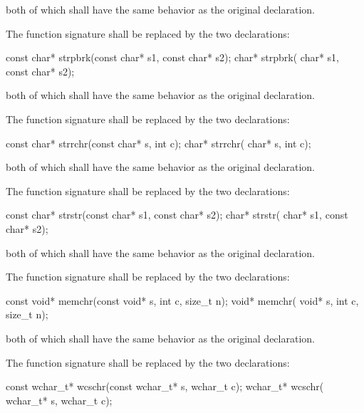 both of which shall have the same behavior as the original declaration.

\pnum
{}%
The function signature
shall be replaced by the two declarations:

\begin{codeblock}
const char* strpbrk(const char* s1, const char* s2);
      char* strpbrk(      char* s1, const char* s2);
\end{codeblock}

both of which shall have the same behavior as the original declaration.

\pnum
{}%
The function signature
shall be replaced by the two declarations:

\begin{codeblock}
const char* strrchr(const char* s, int c);
      char* strrchr(      char* s, int c);
\end{codeblock}

both of which shall have the same behavior as the original declaration.

\pnum
{}%
The function signature
shall be replaced by the two declarations:

\begin{codeblock}
const char* strstr(const char* s1, const char* s2);
      char* strstr(      char* s1, const char* s2);
\end{codeblock}

both of which shall have the same behavior as the original declaration.

\pnum
{}%
The function signature
shall be replaced by the two declarations:

\begin{codeblock}
const void* memchr(const void* s, int c, size_t n);
      void* memchr(      void* s, int c, size_t n);
\end{codeblock}

both of which shall have the same behavior as the original declaration.

\pnum
{}%
The function signature
shall be replaced by the two declarations:

\begin{codeblock}
const wchar_t* wcschr(const wchar_t* s, wchar_t c);
      wchar_t* wcschr(      wchar_t* s, wchar_t c);
\end{codeblock}

